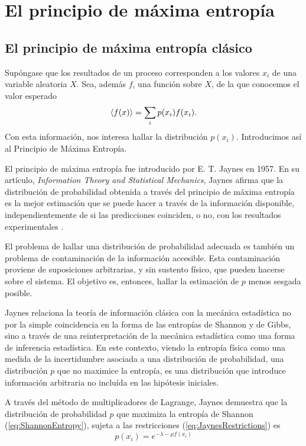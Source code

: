 \section{El principio de máxima entropía}\label{sec:CH1MaxEnt}

\subsection{El principio de máxima entropía clásico}

Supóngase que los resultados de un proceso corresponden a los valores $x_{i}$ de una variable aleatoria $X$. Sea, además $f$, una función sobre $X$, de la que conocemos el valor esperado
\begin{equation}\label{eq:JaynesRestrictions}
    \expval{f(x)}=\sum_{i}p(x_{i})f(x_{i}).
\end{equation}
Con esta información, nos interesa hallar la distribución $p(x_{i})$. Introducimos así al Principio de Máxima Entropía.

El principio de máxima entropía fue introducido por E. T. Jaynes en 1957. En su artículo, \textit{Information Theory and Statistical Mechanics}, Jaynes afirma que la distribución de probabilidad obtenida a través del principio de máxima entropía es la mejor estimación que se puede hacer a través de la información disponible, independientemente de si las predicciones coinciden, o no, con los resultados experimentales \cite{JaynesI}.

El problema de hallar una distribución de probabilidad adecuada es también un problema de contaminación de la información accesible. Esta contaminación proviene de suposiciones arbitrarias, y sin sustento físico, que pueden hacerse sobre el sistema. El objetivo es, entonces, hallar la estimación de $p$ menos sesgada posible.

Jaynes relaciona la teoría de información clásica con la mecánica estadística no por la simple coincidencia en la forma de las entropías de Shannon y de Gibbs, sino a través de una reinterpretación de la mecánica estadística como una forma de inferencia estadística. En este contexto, viendo la entropía física como una medida de la incertidumbre asociada a una distribución de probabilidad, una distribución $p$ que no maximice la entropía, es una distribución que introduce información arbitraria no incluída en las hipótesis iniciales.

A través del método de multiplicadores de Lagrange, Jaynes demuestra que la distribución de probabilidad $p$ que maximiza la entropía de Shannon (\ref{eq:ShannonEntropy}), sujeta a las restricciones (\ref{eq:JaynesRestrictions}) es 
\begin{equation}
    p(x_{i})=e^{-\lambda-\mu f(x_{i})}
\end{equation}

